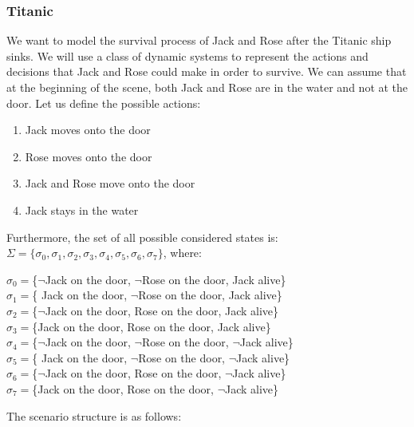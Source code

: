 \documentclass[a4paper]{article}
\begin{document}
\subsubsection{Titanic}
We want to model the survival process of Jack and Rose after the Titanic ship sinks. We will use a class of dynamic systems to represent the actions and decisions that Jack and Rose could make in order to survive. We can assume that at the beginning of the scene, both Jack and Rose are in the water and not at the door. 
Let us define the possible actions:
\begin{enumerate}
    \item Jack moves onto the door
    \item Rose moves onto the door
    \item Jack and Rose move onto the door
    \item Jack stays in the water
\end{enumerate}
Furthermore, the set of all possible considered states is: $\Sigma = \{{\sigma_0, \sigma_1, \sigma_2, \sigma_3, \sigma_4, \sigma_5, \sigma_6, \sigma_7\}}$, where:
\begin{center}
$\sigma_0 = $\{{$\neg$Jack on the door, $\neg$Rose on the door, Jack alive\}} \\[0.1\baselineskip] 
$\sigma_1 = $\{{ Jack on the door, $\neg$Rose on the door, Jack alive\}} \\[0.1\baselineskip] 
$\sigma_2 = $\{{$\neg$Jack on the door,  Rose on the door, Jack alive\}} \\[0.1\baselineskip] 
$\sigma_3 = $\{{Jack on the door,  Rose on the door, Jack alive\}} \\[0.1\baselineskip] 
$\sigma_4 = $\{{$\neg$Jack on the door, $\neg$Rose on the door, $\neg$Jack alive\}} \\[0.1\baselineskip] 
$\sigma_5 = $\{{ Jack on the door, $\neg$Rose on the door, $\neg$Jack alive\}} \\[0.1\baselineskip] 
$\sigma_6 = $\{{$\neg$Jack on the door,  Rose on the door, $\neg$Jack alive\}} \\[0.1\baselineskip] 
$\sigma_7 = $\{{Jack on the door,  Rose on the door, $\neg$Jack alive\}} \\[0.1\baselineskip]
\end{center}
The scenario structure is as follows:
\end{document}
